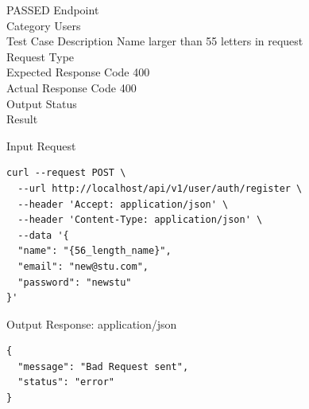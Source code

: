 \begin{testcase}{54}{PASSED}
Endpoint \hfill {}\\
Category \hfill Users\\
Test Case Description \hfill Name larger than 55 letters in request\\

Request Type    \hfill {}\\
Expected Response Code    \hfill 400\\
Actual Response Code    \hfill 400\\

Output Status \hfill {}\\
Result \hfill {}

\begin{ipblock}{Input Request}
\begin{verbatim}
curl --request POST \
  --url http://localhost/api/v1/user/auth/register \
  --header 'Accept: application/json' \
  --header 'Content-Type: application/json' \
  --data '{
  "name": "{56_length_name}",
  "email": "new@stu.com",
  "password": "newstu"
}'
\end{verbatim}
\end{ipblock}

\begin{opblock}{Output Response: application/json}
\begin{verbatim}
{
  "message": "Bad Request sent",
  "status": "error"
}
\end{verbatim}
\end{opblock}
\end{testcase}


